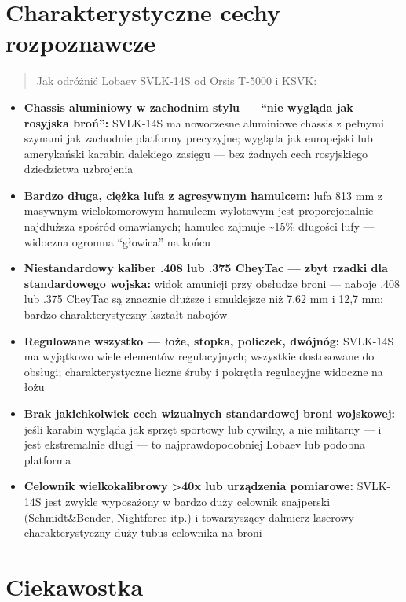 \documentclass[12pt,openany,oneside]{book}
\providecommand{\tightlist}{%
  \setlength{\itemsep}{0pt}\setlength{\parskip}{0pt}}
\begin{document}
\section{Charakterystyczne cechy
rozpoznawcze}\label{charakterystyczne-cechy-rozpoznawcze-67}

\begin{quote}
Jak odróżnić Lobaev SVLK-14S od Orsis T-5000 i KSVK:
\end{quote}

\begin{itemize}
\tightlist
\item
  \textbf{Chassis aluminiowy w zachodnim stylu --- ``nie wygląda jak
  rosyjska broń'':} SVLK-14S ma nowoczesne aluminiowe chassis z pełnymi
  szynami jak zachodnie platformy precyzyjne; wygląda jak europejski lub
  amerykański karabin dalekiego zasięgu --- bez żadnych cech rosyjskiego
  dziedzictwa uzbrojenia
\item
  \textbf{Bardzo długa, ciężka lufa z agresywnym hamulcem:} lufa 813 mm
  z masywnym wielokomorowym hamulcem wylotowym jest proporcjonalnie
  najdłuższa spośród omawianych; hamulec zajmuje \textasciitilde15\%
  długości lufy --- widoczna ogromna ``głowica'' na końcu
\item
  \textbf{Niestandardowy kaliber .408 lub .375 CheyTac --- zbyt rzadki
  dla standardowego wojska:} widok amunicji przy obsłudze broni ---
  naboje .408 lub .375 CheyTac są znacznie dłuższe i smuklejsze niż 7,62
  mm i 12,7 mm; bardzo charakterystyczny kształt nabojów
\item
  \textbf{Regulowane wszystko --- łoże, stopka, policzek, dwójnóg:}
  SVLK-14S ma wyjątkowo wiele elementów regulacyjnych; wszystkie
  dostosowane do obsługi; charakterystyczne liczne śruby i pokrętła
  regulacyjne widoczne na łożu
\item
  \textbf{Brak jakichkolwiek cech wizualnych standardowej broni
  wojskowej:} jeśli karabin wygląda jak sprzęt sportowy lub cywilny, a
  nie militarny --- i jest ekstremalnie długi --- to najprawdopodobniej
  Lobaev lub podobna platforma
\item
  \textbf{Celownik wielkokalibrowy \textgreater40x lub urządzenia
  pomiarowe:} SVLK-14S jest zwykle wyposażony w bardzo duży celownik
  snajperski (Schmidt\&Bender, Nightforce itp.) i towarzyszący dalmierz
  laserowy --- charakterystyczny duży tubus celownika na broni
\end{itemize}

\section{Ciekawostka}\label{ciekawostka-67}
\end{document}

